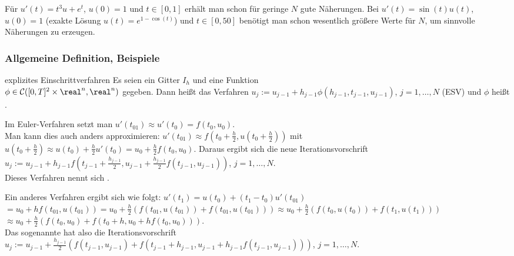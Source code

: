 \begin{Bsp}
    Für $u'(t) = t^3 u + e^t$, $u(0) = 1$ und $t \in [0, 1]$ erhält man schon
    für geringe $N$ gute Näherungen.
    Bei $u'(t) = \sin(t) u(t)$, $u(0) = 1$
    (exakte Lösung $u(t) = e^{1 - \cos(t)}$) und $t \in [0, 50]$
    benötigt man schon wesentlich größere Werte für $N$, um sinnvolle
    Näherungen zu erzeugen.
\end{Bsp}

\subsubsection{%
    Allgemeine Definition, Beispiele%
}

\begin{Def}{explizites Einschrittverfahren}
    Es seien ein Gitter $I_h$ und eine Funktion\\
    $\phi \in \C([0, T]^2 \times \real^n, \real^n)$ gegeben.
    Dann heißt das Verfahren
    $u_j := u_{j-1} + h_{j-1} \phi(h_{j-1}, t_{j-1}, u_{j-1})$,
    $j = 1, \dotsc, N$  (ESV)
    und $\phi$ heißt .
\end{Def}

\begin{Bsp}
    Im Euler-Verfahren setzt man
    $u'(t_{01}) \approx u'(t_0) = f(t_0, u_0)$.\\
    Man kann dies auch anders approximieren:
    $u'(t_{01}) \approx f(t_0 + \frac{h}{2}, u(t_0 + \frac{h}{2}))$ mit\\
    $u(t_0 + \frac{h}{2}) \approx u(t_0) + \frac{h}{2} u'(t_0) =
    u_0 + \frac{h}{2} f(t_0, u_0)$.
    Daraus ergibt sich die neue Iterationsvorschrift
    $u_j := u_{j-1} + h_{j-1} f(t_{j-1} + \frac{h_{j-1}}{2}, u_{j-1} +
    \frac{h_{j-1}}{2} f(t_{j-1}, u_{j-1}))$, $j = 1, \dotsc, N$.\\
    Dieses Verfahren nennt sich
    .
\end{Bsp}

\begin{Bsp}
    Ein anderes Verfahren ergibt sich wie folgt:
    $u'(t_1) = u(t_0) + (t_1 - t_0) u'(t_{01})$\\
    $= u_0 + h f(t_{01}, u(t_{01})) =
    u_0 + \frac{h}{2} (f(t_{01}, u(t_{01})) + f(t_{01}, u(t_{01}))) \approx
    u_0 + \frac{h}{2} (f(t_0, u(t_0)) + f(t_1, u(t_1)))$\\
    $\approx
    u_0 + \frac{h}{2} (f(t_0, u_0) + f(t_0 + h, u_0 + h f(t_0, u_0)))$.\\
    Das sogenannte  hat also die
    Iterationsvorschrift\\
    $u_j := u_{j-1} + \frac{h_{j-1}}{2} (f(t_{j-1}, u_{j-1}) +
    f(t_{j-1} + h_{j-1}, u_{j-1} + h_{j-1} f(t_{j-1}, u_{j-1})))$,
    $j = 1, \dotsc, N$.
\end{Bsp}

